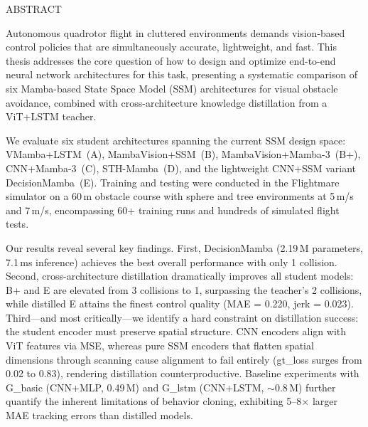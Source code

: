 \documentclass[12pt,a4paper]{article}
\makeatletter
\numberwithin{equation}{section}
\numberwithin{figure}{section}
\numberwithin{table}{section}
\newcommand{\cleardoublepage}{\clearpage\if@twoside\ifodd\c@page\else\hbox{}\thispagestyle{empty}\newpage\if@twocolumn\hbox{}\newpage\fi\fi\fi}%
\makeatother
\begin{document}
\cleardoublepage

\begin{center}
{\fontsize{18}{22}\selectfont ABSTRACT}
\end{center}

\vspace{0.8cm}

Autonomous quadrotor flight in cluttered environments demands vision-based control policies that are simultaneously accurate, lightweight, and fast. This thesis addresses the core question of how to design and optimize end-to-end neural network architectures for this task, presenting a systematic comparison of six Mamba-based State Space Model (SSM) architectures for visual obstacle avoidance, combined with cross-architecture knowledge distillation from a ViT+LSTM teacher.

We evaluate six student architectures spanning the current SSM design space: VMamba+LSTM~(A), MambaVision+SSM~(B), MambaVision+Mamba-3~(B+), CNN+Mamba-3~(C), STH-Mamba~(D), and the lightweight CNN+SSM variant DecisionMamba~(E). Training and testing were conducted in the Flightmare simulator on a 60\,m obstacle course with sphere and tree environments at 5\,m/s and 7\,m/s, encompassing 60+ training runs and hundreds of simulated flight tests.

Our results reveal several key findings. First, DecisionMamba (2.19\,M parameters, 7.1\,ms inference) achieves the best overall performance with only 1 collision. Second, cross-architecture distillation dramatically improves all student models: B+ and E are elevated from 3 collisions to 1, surpassing the teacher's 2 collisions, while distilled E attains the finest control quality (MAE = 0.220, jerk = 0.023). Third---and most critically---we identify a hard constraint on distillation success: the student encoder must preserve spatial structure. CNN encoders align with ViT features via MSE, whereas pure SSM encoders that flatten spatial dimensions through scanning cause alignment to fail entirely (gt\_loss surges from 0.02 to 0.83), rendering distillation counterproductive. Baseline experiments with G\_basic (CNN+MLP, 0.49\,M) and G\_lstm (CNN+LSTM, $\sim$0.8\,M) further quantify the inherent limitations of behavior cloning, exhibiting 5--8$\times$ larger MAE tracking errors than distilled models.
\end{document}
